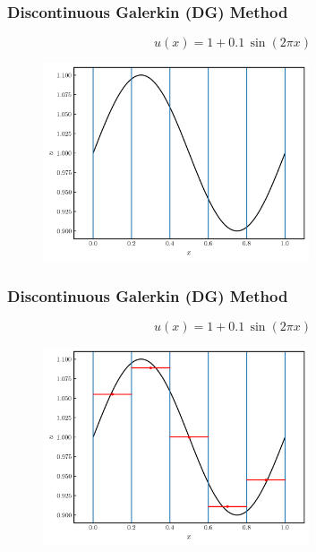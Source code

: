 \documentclass{beamer}
\begin{document}
\begin{frame}
\frametitle{Discontinuous Galerkin (DG) Method}

  \Fontvi

  \begin{equation*}
    u\left(x\right)=1+0.1\,\sin\left(2\pi x\right)
  \end{equation*}

  \begin{figure}[htb!]
    \centering
    \includegraphics[width=0.7\textwidth]{fig.sineWithLines.png}
  \end{figure}

\end{frame}

\begin{frame}
\frametitle{Discontinuous Galerkin (DG) Method}

  \Fontvi

  \begin{equation*}
    u\left(x\right)=1+0.1\,\sin\left(2\pi x\right)
  \end{equation*}

  \begin{figure}[htb!]
    \centering
    \includegraphics[width=0.7\textwidth]{fig.sineWithLines_DG0.png}
  \end{figure}

\end{frame}
\end{document}
